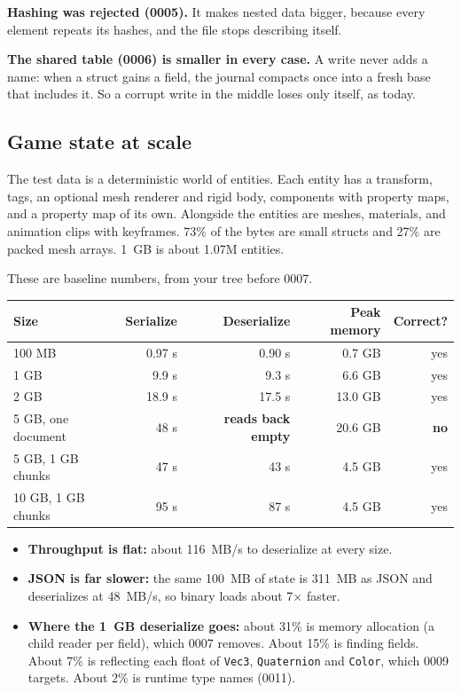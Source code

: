 \documentclass[11pt,a4paper]{article}
\newcommand{\code}[1]{\texttt{#1}}
\begin{document}
\textbf{Hashing was rejected (0005).} It makes nested data bigger, because every element repeats its hashes, and the file stops describing itself.

\textbf{The shared table (0006) is smaller in every case.} A write never adds a name: when a struct gains a field, the journal compacts once into a fresh base that includes it. So a corrupt write in the middle loses only itself, as today.

\subsection{Game state at scale}

The test data is a deterministic world of entities. Each entity has a transform, tags, an optional mesh renderer and rigid body, components with property maps, and a property map of its own. Alongside the entities are meshes, materials, and animation clips with keyframes. 73\% of the bytes are small structs and 27\% are packed mesh arrays. 1~GB is about 1.07M entities.

These are baseline numbers, from your tree before 0007.

\begin{tabularx}{\textwidth}{@{}X r r r r@{}}
\toprule
Size & Serialize & Deserialize & Peak memory & Correct? \\
\midrule
100 MB & 0.97 s & 0.90 s & 0.7 GB & yes \\
1 GB & 9.9 s & 9.3 s & 6.6 GB & yes \\
2 GB & 18.9 s & 17.5 s & 13.0 GB & yes \\
5 GB, one document & 48 s & \textbf{reads back empty} & 20.6 GB & \textbf{no} \\
5 GB, 1 GB chunks & 47 s & 43 s & 4.5 GB & yes \\
10 GB, 1 GB chunks & 95 s & 87 s & 4.5 GB & yes \\
\bottomrule
\end{tabularx}

\begin{itemize}
  \item \textbf{Throughput is flat:} about 116~MB/s to deserialize at every size.
  \item \textbf{JSON is far slower:} the same 100~MB of state is 311~MB as JSON and deserializes at 48~MB/s, so binary loads about 7$\times$ faster.
  \item \textbf{Where the 1~GB deserialize goes:} about 31\% is memory allocation (a child reader per field), which 0007 removes. About 15\% is finding fields. About 7\% is reflecting each float of \code{Vec3}, \code{Quaternion} and \code{Color}, which 0009 targets. About 2\% is runtime type names (0011).
\end{itemize}
\end{document}
